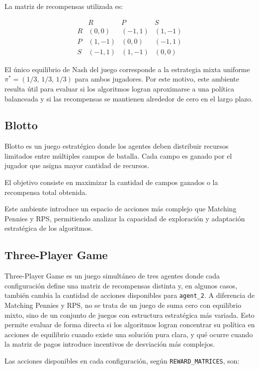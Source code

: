 \documentclass[letterpaper,12pt]{article} %
\begin{document}
La matriz de recompensas utilizada es:

\[
\begin{array}{c|ccc}
 & R & P & S \\
\hline
R & (0,0) & (-1,1) & (1,-1) \\
P & (1,-1) & (0,0) & (-1,1) \\
S & (-1,1) & (1,-1) & (0,0)
\end{array}
\]

El único equilibrio de Nash del juego corresponde a la estrategia mixta uniforme $\pi^* = (1/3,\, 1/3,\, 1/3)$ para ambos jugadores. Por este motivo, este ambiente resulta útil para evaluar si los algoritmos logran aproximarse a una política balanceada y si las recompensas se mantienen alrededor de cero en el largo plazo.


\subsection{Blotto}

Blotto es un juego estratégico donde los agentes deben distribuir recursos limitados entre múltiples campos de batalla. Cada campo es ganado por el jugador que asigna mayor cantidad de recursos.

El objetivo consiste en maximizar la cantidad de campos ganados o la recompensa total obtenida.

Este ambiente introduce un espacio de acciones más complejo que Matching Pennies y RPS, permitiendo analizar la capacidad de exploración y adaptación estratégica de los algoritmos.


\subsection{Three-Player Game}

Three-Player Game es un juego simultáneo de tres agentes donde cada configuración define una matriz de recompensas distinta y, en algunos casos, también cambia la cantidad de acciones disponibles para \texttt{agent\_2}. A diferencia de Matching Pennies y RPS, no se trata de un juego de suma cero con equilibrio mixto, sino de un conjunto de juegos con estructura estratégica más variada. Esto permite evaluar de forma directa si los algoritmos logran concentrar su política en acciones de equilibrio cuando existe una solución pura clara, y qué ocurre cuando la matriz de pagos introduce incentivos de desviación más complejos.

Las acciones disponibles en cada configuración, según \texttt{REWARD\_MATRICES}, son:
\end{document}
